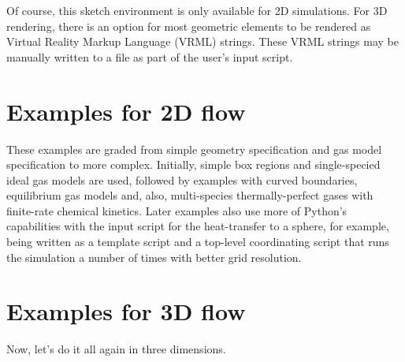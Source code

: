 \documentclass[12pt,a4paper,twoside]{article}
\begin{document}
\medskip
Of course, this sketch environment is only available for 2D simulations.
For 3D rendering, there is an option for most geometric elements to be rendered as
Virtual Reality Markup Language (VRML) strings.  
These VRML strings may be manually written to a file as part of the user's input script.
 
\cleardoublepage

\part{Examples for 2D flow}
%
These examples are graded from simple geometry specification and gas model specification
to more complex.
Initially, simple box regions and single-specied ideal gas models are used, followed by
examples with curved boundaries, equilibrium gas models and, also, 
multi-species thermally-perfect gases with finite-rate chemical kinetics.
Later examples also use more of Python's capabilities with the input script for the 
heat-transfer to a sphere, for example, being written as a template script and a top-level 
coordinating script that runs the simulation a number of times with better grid resolution.


\cleardoublepage

\cleardoublepage

\cleardoublepage

\cleardoublepage

\cleardoublepage

\cleardoublepage

\cleardoublepage

\cleardoublepage

\cleardoublepage

\cleardoublepage

\cleardoublepage

\cleardoublepage

\cleardoublepage

\cleardoublepage

\cleardoublepage

\cleardoublepage

\cleardoublepage

\cleardoublepage

\cleardoublepage

\cleardoublepage

\cleardoublepage

\part{Examples for 3D flow}
%
Now, let's do it all again in three dimensions.


\cleardoublepage

\cleardoublepage

\cleardoublepage

\cleardoublepage

\cleardoublepage

\cleardoublepage

\cleardoublepage
\end{document}
